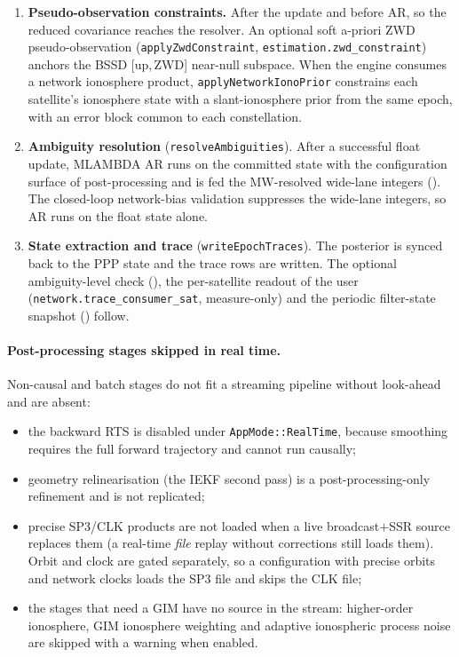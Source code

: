 \documentclass[main.tex]{subfiles}
\begin{document}
\begin{enumerate}[leftmargin=*, itemsep=0pt]
      excluded from the update.
\item \textbf{Pseudo-observation constraints.}  After the update and
      before AR, so the reduced covariance reaches the resolver.  An
      optional soft a-priori ZWD pseudo-observation
      (\texttt{applyZwdConstraint}, \texttt{estimation.zwd\_constraint})
      anchors the BSSD [up,\,ZWD] near-null subspace.  When the engine
      consumes a network ionosphere product,
      \texttt{applyNetworkIonoPrior} constrains each satellite's
      ionosphere state with a slant-ionosphere prior from the same
      epoch, with an error block common to each constellation.
\item \textbf{Ambiguity resolution} (\texttt{resolveAmbiguities}).
      After a successful float update,
      MLAMBDA AR runs on the committed state with the configuration
      surface of post-processing and is fed the MW-resolved wide-lane
      integers ().  The
      closed-loop network-bias validation suppresses the wide-lane
      integers, so AR runs on the float state alone.
\item \textbf{State extraction and trace} (\texttt{writeEpochTraces}).
      The posterior is synced back to the PPP state and the trace rows
      are written.  The optional
      ambiguity-level check (), the per-satellite
      readout of the user (\texttt{network.trace\_consumer\_sat}, measure-only)
      and the periodic filter-state snapshot () follow.
\end{enumerate}

\paragraph{Post-processing stages skipped in real time.}
Non-causal and batch stages do not fit a streaming pipeline without
look-ahead and are absent:
\begin{itemize}[leftmargin=*, itemsep=0pt]
\item the backward RTS  is disabled under
      \texttt{AppMode::RealTime}, because smoothing requires the full
      forward trajectory and cannot run causally;
\item geometry relinearisation (the IEKF second pass) is a
      post-processing-only refinement and is not replicated;
\item precise SP3/CLK products are not loaded when a live
      broadcast$+$SSR source replaces them (a real-time \emph{file}
      replay without corrections still loads them).  Orbit and clock are
      gated separately, so a configuration with precise orbits and
      network clocks loads the SP3 file and skips the CLK file;
\item the stages that need a GIM have no source in the stream:
      higher-order ionosphere, GIM ionosphere weighting and adaptive
      ionospheric process noise are skipped with a warning when enabled.
\end{itemize}
\end{document}
